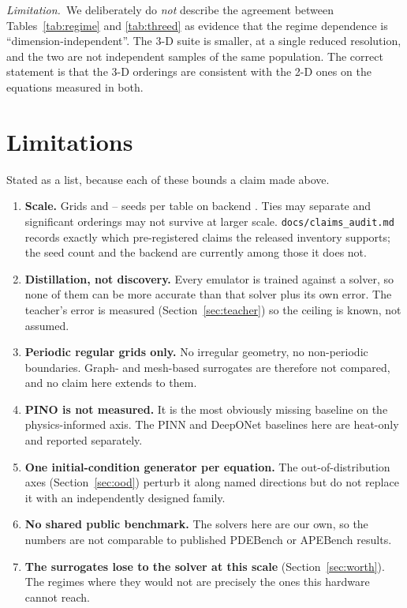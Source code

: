 \documentclass{article}
\newcommand{\code}[1]{\texttt{\small #1}}
\newcommand{\limitation}[1]{\par\smallskip\noindent\textit{Limitation.}~#1\par\smallskip}
\begin{document}
\limitation{We deliberately do \emph{not} describe the agreement between
Tables~\ref{tab:regime} and \ref{tab:threed} as evidence that the regime dependence is
``dimension-independent''. The 3-D suite is smaller, at a single reduced resolution, and
the two are not independent samples of the same population. The correct statement is that
the 3-D orderings are consistent with the 2-D ones on the equations measured in both.}

\section{Limitations}
\label{sec:limits}

Stated as a list, because each of these bounds a claim made above.

\begin{enumerate}
\item \textbf{Scale.} Grids \Grids{} and \MinSeeds--\MaxSeeds{} seeds per table on backend
  \Backends{}. Ties may separate and significant orderings may not survive at larger
  scale. \code{docs/claims\_audit.md} records exactly which pre-registered claims the
  released inventory supports; the seed count and the backend are currently among those it
  does not.
\item \textbf{Distillation, not discovery.} Every emulator is trained against a solver, so
  none of them can be more accurate than that solver plus its own error. The teacher's
  error is measured (Section~\ref{sec:teacher}) so the ceiling is known, not assumed.
\item \textbf{Periodic regular grids only.} No irregular geometry, no non-periodic
  boundaries. Graph- and mesh-based surrogates are therefore not compared, and no claim
  here extends to them.
\item \textbf{PINO is not measured.} It is the most obviously missing baseline on the
  physics-informed axis. The PINN and DeepONet baselines here are heat-only and reported
  separately.
\item \textbf{One initial-condition generator per equation.} The out-of-distribution axes
  (Section~\ref{sec:ood}) perturb it along named directions but do not replace it with an
  independently designed family.
\item \textbf{No shared public benchmark.} The solvers here are our own, so the numbers are
  not comparable to published PDEBench or APEBench results.
\item \textbf{The surrogates lose to the solver at this scale} (Section~\ref{sec:worth}).
  The regimes where they would not are precisely the ones this hardware cannot reach.
\end{enumerate}
\end{document}
